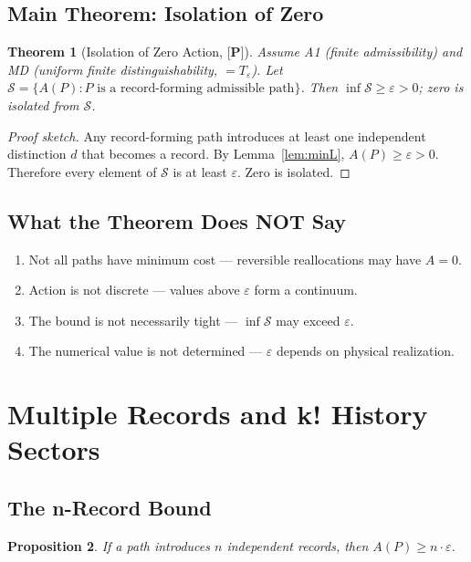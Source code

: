 \documentclass[11pt]{article}
\newcommand{\epitag}[1]{\textbf{[#1]}}
\newtheorem{theorem}{Theorem}[section]
\newtheorem{proposition}[theorem]{Proposition}
\theoremstyle{definition}
\begin{document}
\subsection{Main Theorem: Isolation of Zero}
\begin{theorem}[Isolation of Zero Action, $\epitag{P}$]\label{thm:isolation}
Assume A1 (finite admissibility) and MD (uniform finite distinguishability, $= T_\varepsilon$).  Let $\mathcal{S} = \{A(P) : P \text{ is a record-forming admissible path}\}$.  Then $\inf \mathcal{S} \ge \varepsilon > 0$; zero is isolated from $\mathcal{S}$.
\end{theorem}

\begin{proof}[Proof sketch]
Any record-forming path introduces at least one independent distinction $d$ that becomes a record.  By Lemma~\ref{lem:minL}, $A(P) \ge \varepsilon > 0$.  Therefore every element of $\mathcal{S}$ is at least $\varepsilon$.  Zero is isolated.
\end{proof}

\subsection{What the Theorem Does NOT Say}
\begin{enumerate}
\item Not all paths have minimum cost --- reversible reallocations may have $A = 0$.
\item Action is not discrete --- values above $\varepsilon$ form a continuum.
\item The bound is not necessarily tight --- $\inf \mathcal{S}$ may exceed $\varepsilon$.
\item The numerical value is not determined --- $\varepsilon$ depends on physical realization.
\end{enumerate}

\section{Multiple Records and k! History Sectors}\label{sec:krecord}

\subsection{The n-Record Bound}
\begin{proposition}\label{prop:nrec}
If a path introduces $n$ independent records, then $A(P) \ge n \cdot \varepsilon$.
\end{proposition}
\end{document}
